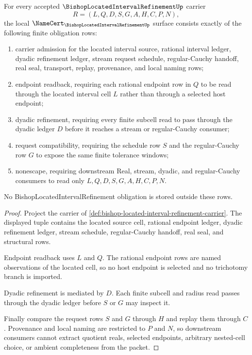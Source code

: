 \begin{theorem}
\label{thm:bishop-located-interval-refinement-namecert-obligations}
For every accepted $\BishopLocatedIntervalRefinementUp$ carrier
$$
R=(L,Q,D,S,G,A,H,C,P,N),
$$
the local $\NameCert_{\BishopLocatedIntervalRefinementUp}$ surface consists exactly of the following finite obligation rows:
\begin{enumerate}
\item carrier admission for the located interval source, rational interval ledger, dyadic refinement ledger, stream request schedule, regular-Cauchy handoff, real seal, transport, replay, provenance, and local naming rows;
\item endpoint readback, requiring each rational endpoint row in $Q$ to be read through the located interval cell $L$ rather than through a selected host endpoint;
\item dyadic refinement, requiring every finite subcell read to pass through the dyadic ledger $D$ before it reaches a stream or regular-Cauchy consumer;
\item request compatibility, requiring the schedule row $S$ and the regular-Cauchy row $G$ to expose the same finite tolerance windows;
\item nonescape, requiring downstream Real, stream, dyadic, and regular-Cauchy consumers to read only $L,Q,D,S,G,A,H,C,P,N$.
\end{enumerate}
No BishopLocatedIntervalRefinement obligation is stored outside these rows.
\end{theorem}
\begin{proof}
Project the carrier of \autoref{def:bishop-located-interval-refinement-carrier}. The displayed tuple contains the located source cell, rational endpoint ledger, dyadic refinement ledger, stream schedule, regular-Cauchy handoff, real seal, and structural rows.

Endpoint readback uses $L$ and $Q$. The rational endpoint rows are named observations of the located cell, so no host endpoint is selected and no trichotomy branch is imported.

Dyadic refinement is mediated by $D$. Each finite subcell and radius read passes through the dyadic ledger before $S$ or $G$ may inspect it.

Finally compare the request rows $S$ and $G$ through $H$ and replay them through $C$. Provenance and local naming are restricted to $P$ and $N$, so downstream consumers cannot extract quotient reals, selected endpoints, arbitrary nested-cell choice, or ambient completeness from the packet.
\end{proof}

